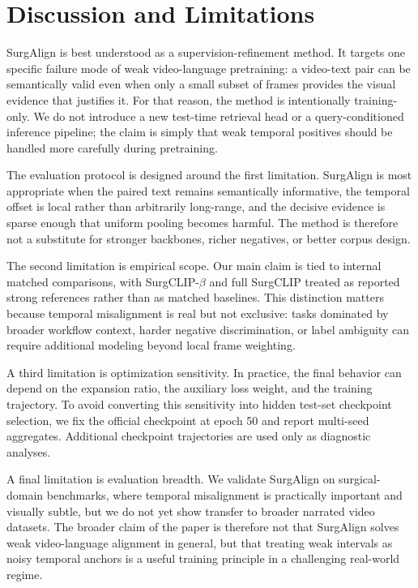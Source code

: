\section{Discussion and Limitations}
\label{sec:discussion}

SurgAlign is best understood as a supervision-refinement method. It targets one specific failure mode of weak video-language pretraining: a video-text pair can be semantically valid even when only a small subset of frames provides the visual evidence that justifies it. For that reason, the method is intentionally training-only. We do not introduce a new test-time retrieval head or a query-conditioned inference pipeline; the claim is simply that weak temporal positives should be handled more carefully during pretraining.

The evaluation protocol is designed around the first limitation. SurgAlign is most appropriate when the paired text remains semantically informative, the temporal offset is local rather than arbitrarily long-range, and the decisive evidence is sparse enough that uniform pooling becomes harmful. The method is therefore not a substitute for stronger backbones, richer negatives, or better corpus design.

The second limitation is empirical scope. Our main claim is tied to internal matched comparisons, with SurgCLIP-$\beta$ and full SurgCLIP treated as reported strong references rather than as matched baselines. This distinction matters because temporal misalignment is real but not exclusive: tasks dominated by broader workflow context, harder negative discrimination, or label ambiguity can require additional modeling beyond local frame weighting.

A third limitation is optimization sensitivity. In practice, the final behavior can depend on the expansion ratio, the auxiliary loss weight, and the training trajectory. To avoid converting this sensitivity into hidden test-set checkpoint selection, we fix the official checkpoint at epoch 50 and report multi-seed aggregates. Additional checkpoint trajectories are used only as diagnostic analyses.

A final limitation is evaluation breadth. We validate SurgAlign on surgical-domain benchmarks, where temporal misalignment is practically important and visually subtle, but we do not yet show transfer to broader narrated video datasets. The broader claim of the paper is therefore not that SurgAlign solves weak video-language alignment in general, but that treating weak intervals as noisy temporal anchors is a useful training principle in a challenging real-world regime.
